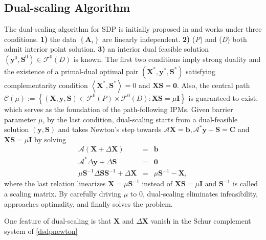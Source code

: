 \documentclass[10pt]{article}
\begin{document}
{{\subsection{Dual-scaling Algorithm}

The dual-scaling algorithm for SDP is initially proposed in
{\cite{benson1999mixed}} and works under three conditions. {\textbf{1)}} the
 data $\left\{ \mathbf{A}_i \right\}$ are linearly independent.
{\textbf{2)}} ({{\em P\/}}) and ({{\em D\/}}) both admit interior point
solution. {\textbf{3)}} an interior dual feasible solution $\left( \mathbf{y}^0,
\mathbf{S}^0 \right) \in \mathcal{F}^0 (D)$ is known. The first two conditions imply
strong duality and the existence of a primal-dual optimal pair $\left(
\mathbf{X}^{\ast}, \mathbf{y}^{\ast}, \mathbf{S}^{\ast} \right)$ satisfying complementarity condition
$\left\langle \mathbf{X}^{\ast}, \mathbf{S}^{\ast} \right\rangle = 0$ and $\mathbf{X} \mathbf{S} = \textbf{0}$.
Also, the central path $\mathcal{C} (\mu) :=
\left\{ \left( \mathbf{X}, \mathbf{y}, \mathbf{S} \right) \in \mathcal{F}^0 (P) \times \mathcal{F}^0
(D) : \mathbf{X} \mathbf{S} = \mu \mathbf{I} \right\}$ is guaranteed to exist,  which serves as the foundation of the
path-following IPMs. Given barrier parameter $\mu$, by the last condition, 
dual-scaling starts from a dual-feasible solution
$\left( \mathbf{y}, \mathbf{S} \right)$ and takes Newton's step towards $\mathcal{A} \mathbf{X} = \mathbf{b},
\mathcal{A}^{\ast} \mathbf{y} + \mathbf{S} = \mathbf{C}$ and $\mathbf{X} \mathbf{S} = \mu \mathbf{I}$ by solving
\begin{eqnarray}\label{dsdpnewton}
  \mathcal{A} \left( \mathbf{X} + \Delta \mathbf{X} \right) & = & \mathbf{b} \nonumber \\
  \mathcal{A}^{\ast} \Delta \mathbf{y} + \Delta \mathbf{S} & = & \textbf{0} \\
  \mu \mathbf{S}^{- 1} \Delta \mathbf{S} \mathbf{S}^{- 1} + \Delta \mathbf{X} & = & \mu \mathbf{S}^{- 1} - \mathbf{X} \nonumber, 
\end{eqnarray}
where the last relation linearizes $\mathbf{X} = \mu \mathbf{S}^{- 1}$ instead of $\mathbf{X} \mathbf{S} =
\mu \mathbf{I}$ and $\mathbf{S}^{- 1}$ is called a scaling matrix. 
By carefully driving $\mu$ to 0, dual-scaling eliminates infeasibility, approaches optimality, and finally solves the problem.

One feature of dual-scaling is that $\mathbf{X}$ and $\Delta \mathbf{X}$
vanish in the Schur complement system of \eqref{dsdpnewton}

}}
\end{document}
